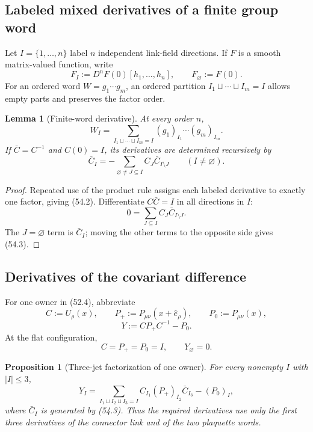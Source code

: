 \documentclass[11pt,oneside]{book}
\newtheorem{lemma}[theorem]{Lemma}
\newtheorem{proposition}[theorem]{Proposition}
\theoremstyle{definition}
\theoremstyle{remark}
\begin{document}
\subsection{Labeled mixed derivatives of a finite group word}

Let \(I=\{1,\ldots,n\}\) label \(n\) independent link-field
directions.  If \(F\) is a smooth matrix-valued function, write
\[
 F_I:=D^nF(0)[h_1,\ldots,h_n],\qquad F_\varnothing:=F(0).      \tag{54.1}
\]
For an ordered word \(W=g_1\cdots g_m\), an ordered partition
\(I_1\sqcup\cdots\sqcup I_m=I\) allows empty parts and preserves
the factor order.

\begin{lemma}[Finite-word derivative]
\label{lem:e8v54-word-derivative}
At every order \(n\),
\[
 \boxed{
 W_I
 =\sum_{I_1\sqcup\cdots\sqcup I_m=I}
 (g_1)_{I_1}\cdots(g_m)_{I_m}.}                              \tag{54.2}
\]
If \(\bar C=C^{-1}\) and \(C(0)=I\), its derivatives are determined
recursively by
\[
 \boxed{
 \bar C_I
 =-\sum_{\varnothing\ne J\subseteq I}
 C_J\bar C_{I\setminus J}\qquad(I\ne\varnothing).}            \tag{54.3}
\]
\end{lemma}

\begin{proof}
Repeated use of the product rule assigns each labeled derivative
to exactly one factor, giving (54.2).  Differentiate
\(C\bar C=I\) in all directions in \(I\):
\[
 0=\sum_{J\subseteq I}C_J\bar C_{I\setminus J}.
\]
The \(J=\varnothing\) term is \(\bar C_I\); moving the other terms
to the opposite side gives (54.3).
\end{proof}

\subsection{Derivatives of the covariant difference}

For one owner in (52.4), abbreviate
\[
 C:=U_\rho(x),\qquad P_+:=P_{\mu\nu}(x+\widehat e_\rho),
 \qquad P_0:=P_{\mu\nu}(x),
\]
\[
 Y:=CP_+C^{-1}-P_0.                                          \tag{54.4}
\]
At the flat configuration,
\[
 C=P_+=P_0=I,\qquad Y_\varnothing=0.                          \tag{54.5}
\]

\begin{proposition}[Three-jet factorization of one owner]
\label{prop:e8v54-Y-jets}
For every nonempty \(I\) with \(|I|\le3\),
\[
\boxed{
 Y_I
 =\sum_{I_1\sqcup I_2\sqcup I_3=I}
 C_{I_1}(P_+)_{I_2}\bar C_{I_3}
 -(P_0)_I,}                                                   \tag{54.6}
\]
where \(\bar C_I\) is generated by (54.3).  Thus the required
derivatives use only the first three derivatives of the connector
link and of the two plaquette words.
\end{proposition}
\end{document}
